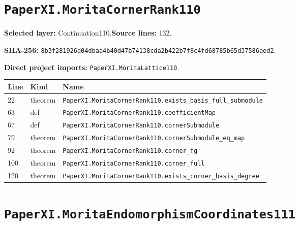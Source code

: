 \documentclass[10pt,oneside]{book}
\begin{document}
\section{\texorpdfstring{\nolinkurl{PaperXI.MoritaCornerRank110}}{PaperXI.MoritaCornerRank110}}\label{module:PaperXI.MoritaCornerRank110}

\textbf{Selected layer:} Continuation110.\quad\textbf{Source lines:} 132.\par\textbf{SHA-256:} {\scriptsize\nolinkurl{8b3f281926d04dbaa4b40d47b74138cda2b422b7f8c4fd68785b65d37586aed2}}.


\textbf{Direct project imports:} \nolinkurl{PaperXI.MoritaLattice110}.

\begin{longtable}{@{}p{}p{}p{}@{}}\toprule Line&Kind&Name\\\midrule\endhead

22&theorem&\nolinkurl{PaperXI.MoritaCornerRank110.exists_basis_full_submodule}\\

63&def&\nolinkurl{PaperXI.MoritaCornerRank110.coefficientMap}\\

67&def&\nolinkurl{PaperXI.MoritaCornerRank110.cornerSubmodule}\\

79&theorem&\nolinkurl{PaperXI.MoritaCornerRank110.cornerSubmodule_eq_map}\\

92&theorem&\nolinkurl{PaperXI.MoritaCornerRank110.corner_fg}\\

100&theorem&\nolinkurl{PaperXI.MoritaCornerRank110.corner_full}\\

120&theorem&\nolinkurl{PaperXI.MoritaCornerRank110.exists_corner_basis_degree}\\

\bottomrule\end{longtable}

\section{\texorpdfstring{\nolinkurl{PaperXI.MoritaEndomorphismCoordinates111}}{PaperXI.MoritaEndomorphismCoordinates111}}\label{module:PaperXI.MoritaEndomorphismCoordinates111}
\end{document}
